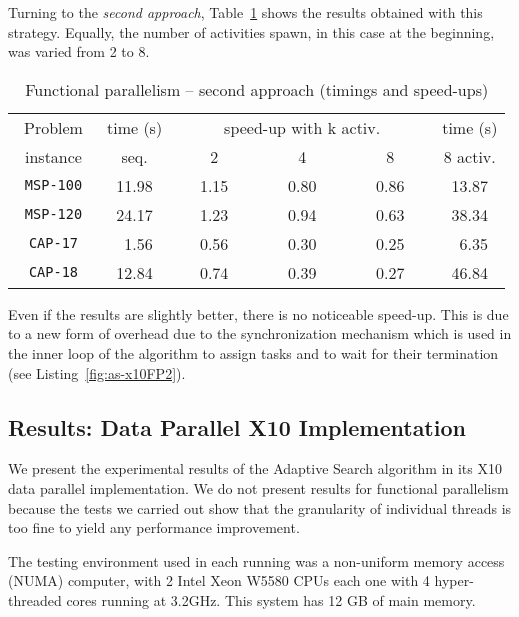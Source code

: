 \documentclass{llncs}
\begin{document}
Turning to the \emph{second approach}, Table~\ref{tab:FP2Result} shows
the results obtained with this strategy. Equally, the number of
activities spawn, in this case at the beginning, was varied from 2 to
8.

\begin{table}[htb]
  \begin{center}
  \begin{tabular}{||c|c|c|c|c|c||}
    \hline
    ~Problem~ & time (s) & \multicolumn{3}{|c|}{speed-up with k activ.} & time (s) \\
    \cline{3-5}
    instance  & seq.     & ~~~~2~~~~ & ~~~~4~~~~ & ~~~~8~~~~            & 8 activ.\\
    \hline
    \hline
    \texttt{MSP-100} & 11.98 & 1.15 & 0.80 & 0.86 & 13.87 \\
    \texttt{MSP-120} & 24.17 & 1.23 & 0.94 & 0.63 & 38.34 \\
    \hline
    \texttt{CAP-17}  & ~1.56 & 0.56 & 0.30 & 0.25 & ~6.35 \\
    \texttt{CAP-18}  & 12.84 & 0.74 & 0.39 & 0.27 & 46.84 \\
    \hline
  \end{tabular}
  \end{center}
  \caption{Functional parallelism -- second approach (timings and speed-ups)}
  \label{tab:FP2Result}
\end{table}

Even if the results are slightly better, there is no noticeable
speed-up. This is due to a new form of overhead due to the synchronization
mechanism which is used in the inner loop of the algorithm to assign tasks
and to wait for their termination (see Listing~\ref{fig:as-x10FP2}).

\subsection{Results: Data Parallel X10 Implementation}
\fi{}

We present the experimental results of the Adaptive Search algorithm
in its X10 data parallel implementation.  We do not present results
for functional parallelism because the tests we carried out show that
the granularity of individual threads is too fine to yield any
performance improvement.

The testing environment used in each running was a non-uniform memory
access (NUMA) computer, with 2 Intel Xeon W5580 CPUs each one with 4
hyper-threaded cores running at 3.2GHz. This system has 12 GB of main
memory.
\end{document}
